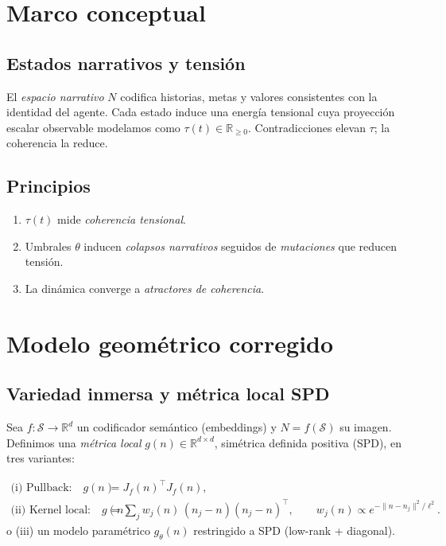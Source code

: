 \documentclass[10pt,a4paper,twocolumn]{article}
\theoremstyle{definition}
\theoremstyle{plain}
\begin{document}
\section{Marco conceptual}
\subsection{Estados narrativos y tensión}
El \emph{espacio narrativo} \(N\) codifica historias, metas y valores consistentes con la identidad del agente. Cada estado induce una energía tensional cuya proyección escalar observable modelamos como \(\tau(t)\in\mathbb{R}_{\ge0}\). Contradicciones elevan \(\tau\); la coherencia la reduce.

\subsection{Principios}
\begin{enumerate}[label=(\alph*)]
  \item \(\tau(t)\) mide \emph{coherencia tensional}.
  \item Umbrales \(\theta\) inducen \emph{colapsos narrativos} seguidos de \emph{mutaciones} que reducen tensión.
  \item La dinámica converge a \emph{atractores de coherencia}.
\end{enumerate}

\section{Modelo geométrico corregido}
\label{sec:geom}
\subsection{Variedad inmersa y métrica local SPD}
Sea $f:\mathcal{S}\to\mathbb{R}^d$ un codificador semántico (embeddings) y $N=f(\mathcal{S})$ su imagen.
Definimos una \emph{métrica local} $g(n)\in\mathbb{R}^{d\times d}$, simétrica definida positiva (SPD), en tres variantes:

\begin{subequations}\label{eq:metricas}
\begin{align}
\text{(i) Pullback:}\quad
g(n) &= J_f(n)^\top J_f(n), \label{eq:pullback}\\[2pt]
\text{(ii) Kernel local:}\quad
g(n) &= \sum_{j} w_j(n)\,(n_j-n)(n_j-n)^\top, \qquad
w_j(n)\propto e^{-\|n-n_j\|^2/\ell^2}. \label{eq:kernelSPD}
\end{align}
\end{subequations}
\noindent
o (iii) un modelo paramétrico $g_\theta(n)$ restringido a SPD (low-rank + diagonal).
\end{document}
